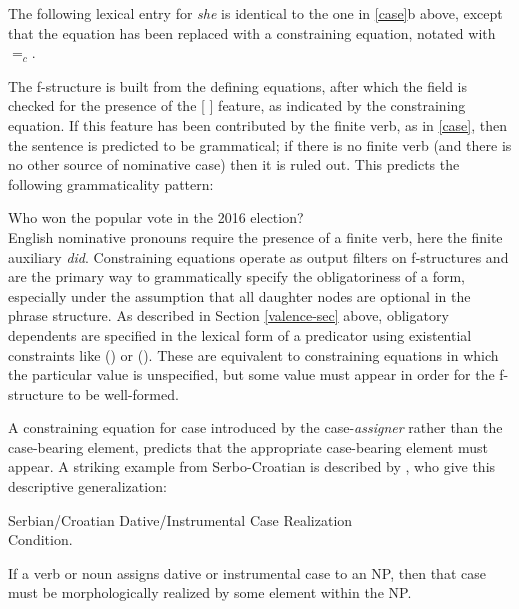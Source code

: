 \documentclass[output=paper
                ,modfonts
                ,nonflat
	        ,collection
	        ,collectionchapter
	        ,collectiontoclongg
 	        ,biblatex
                ,babelshorthands
                ,newtxmath
                ,draftmode
                ,colorlinks, citecolor=brown
]{./langsci/langscibook}
\begin{document}
The following lexical entry for \textit{she} is identical to the one in \ref{case}b above, except that the  equation has been replaced with a constraining equation, notated with $=_c$.  

\ea
\label{constrain}
{\qquad{} }
\z
The f-structure is built from the defining equations, after which the \subj{} field is checked for the presence of the [ ] feature, as indicated by the constraining equation.  If this feature has been contributed by the finite verb, as in \ref{case}, then the sentence is predicted to be grammatical; if there is no finite verb (and there is no other source of nominative case) then it is ruled out.  This predicts the following grammaticality pattern:

\eal  Who won the popular vote in the 2016 election? \\
\label{she}
\zl
English nominative pronouns require the presence of a finite verb, here the finite auxiliary \textit{did}.  Constraining equations operate as output filters on f-structures and are the primary way to grammatically specify the obligatoriness of a form, especially under the assumption that all daughter nodes are optional in the phrase structure.  As described in Section \ref{valence-sec} above, obligatory dependents are specified in the lexical form of a predicator using existential constraints like (\up \subj) or (\up \obj).  These are equivalent to constraining equations in which the particular value is unspecified, but some value must appear in order for the f-structure to be well-formed.  

A constraining equation for case  introduced by the case-\textit{assigner} rather than the case-bearing element, predicts that the appropriate case-bearing element must appear.  A striking example from Serbo-Croatian is described by \citet[p. 134]{WZ2003a}, who give this descriptive generalization:

\ea
{\label{dat-inst}
Serbian/Croatian Dative/Instrumental Case 
Realization\\ Condition.\medskip

If a verb or noun assigns dative or instrumental case to an NP, then that case must be morphologically realized by some element within the NP.}
\z
\end{document}
